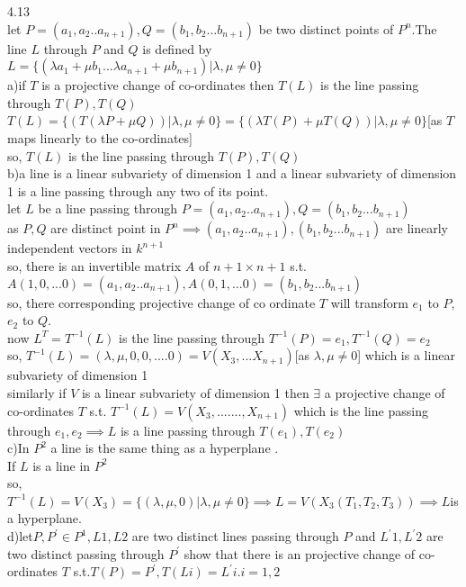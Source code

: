 \documentclass[11pt]{article}
\begin{document}
4.13\\
let $P=(a_1,a_2..a_{n+1}),Q=(b_1,b_2...b_{n+1})$ be two distinct points of $P^n$.The line $L$ through $P$ and $Q$ is defined by $L=\{(\lambda a_1+\mu b_1...\lambda a_{n+1}+\mu b_{n+1})|\lambda,\mu \neq 0\}$\\
a)if $T$ is a projective change of co-ordinates then $T(L)$ is the line passing through $T(P),T(Q)$\\
$T(L)=\{(T(\lambda P+\mu Q))|\lambda,\mu \neq 0\}=\{(\lambda T(P)+\mu T(Q))|\lambda,\mu \neq 0\}$[as $T$ maps linearly to the co-ordinates]\\
so, $T(L)$ is  the line passing through $T(P),T(Q)$\\ 
b)a line is a linear subvariety of dimension 1 and a linear subvariety of dimension 1 is a line passing through any two of its point.\\
let $L$ be a line passing through $P=(a_1,a_2..a_{n+1}),Q=(b_1,b_2...b_{n+1})$\\
 as $P,Q$ are distinct point in $P^n\implies (a_1,a_2..a_{n+1}),(b_1,b_2...b_{n+1})$ are linearly independent vectors in $k^{n+1}$\\
 so, there is an invertible matrix $A$ of $n+1\times n+1$ s.t. $A(1,0,...0)=(a_1,a_2..a_{n+1}),A(0,1,...0)=(b_1,b_2...b_{n+1})$\\
 so, there corresponding projective change of co ordinate $T$ will transform $e_1$ to $P$, $e_2$ to $Q$.\\
 now $ L^{T}=T^{-1}(L)$ is the line passing through $T^{-1}(P)=e_1,T^{-1}(Q)=e_2$\\
 so, $T^{-1}(L)=(\lambda,\mu,0,0,....0)=V(X_3,...X_{n+1})$[as $\lambda,\mu\neq 0$] which is a linear subvariety of dimension 1\\
 similarly if $V$ is a linear subvariety of dimension 1 then $\exists$ a projective change of co-ordinates $T$ s.t. $T^{-1}(L)=V(X_3,.......,X_{n+1})$ which is the line passing through $e_1,e_2\implies L$ is a line passing through $T(e_1),T(e_2)$\\
 c)In $P^2$ a line is the same thing as a hyperplane .\\
If $L$ is a line in $P^2$\\
so, $T^{-1}(L)=V(X_3)=\{(\lambda,\mu,0)|\lambda,\mu\neq 0\}\implies L=V(X_3(T_1,T_2,T_3))\implies L$is a hyperplane.\\
d)let$P, P^{'} \in P^1,L1,L2$ are two distinct lines passing through $P$ and $L^{'}1,L^{'}2$ are two distinct passing through $P^{'}$ show that there is an projective change of co-ordinates $T$ s.t.$T(P)=P^{'},T(Li)=L^{'}i.i=1,2$\\\\
\end{document}
